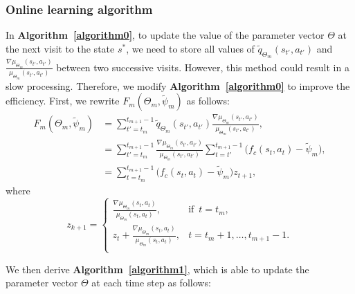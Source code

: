 \documentclass[twocolumn,10pt]{IEEEtran}
\begin{document}
\subsubsection{Online learning algorithm}

In \textbf{Algorithm~\ref{algorithm0}}, to update the value of the parameter vector $\Theta$ at the next visit to the state $s^{*}$, we need to store all values of $\widetilde{q}_{\Theta_{m}}(s_{t'},a_{t'})$ and $\frac{\nabla \mu_{\Theta_{m}}(s_{t'},a_{t'})}{\mu_{\Theta_{m}}(s_{t'},a_{t'})}$ between two successive visits. However, this method could result in a slow processing. Therefore, we modify \textbf{Algorithm~\ref{algorithm0}} to improve the efficiency. First, we rewrite $F_{m}(\Theta_{m},\widetilde{\psi}_{m})$ as follows:
\begin{equation}
\begin{aligned}
F_{m}(\Theta_{m},\widetilde{\psi}_{m}) & = \sum_{t'=t_{m}}^{t_{m+1}-1} \widetilde{q}_{\Theta_{m}}(s_{t'},a_{t'}) \frac{\nabla \mu_{\Theta_{m}}(s_{t'},a_{t'})}{\mu_{\Theta_{m}}(s_{t'},a_{t'})} , \\
&= \sum_{t'=t_{m}}^{t_{m+1}-1}   \frac{\nabla \mu_{\Theta_{m}}(s_{t'},a_{t'})}{\mu_{\Theta_{m}}(s_{t'},a_{t'})}  \sum_{t=t'}^{t_{m+1}-1} \big( f_c (s_{t}, a_{t}) - \widetilde{\psi}_{m}\big) , \\
&= \sum_{t=t_{m}}^{t_{m+1}-1} \big( f_c (s_{t}, a_{t}) - \widetilde{\psi}_{m}\big)  z_{t+1}, 
\end{aligned}
\end{equation}
where
\begin{equation}
z_{k+1} = \left\{ 
\begin{array}{ll}
\frac{\nabla \mu_{\Theta_{m}}(s_{t},a_{t})}{\mu_{\Theta_{m}}(s_{t},a_{t})}, & \text{if} \phantom{1} t = t_{m},\\
z_{t} + \frac{\nabla \mu_{\Theta_{m}}(s_{t},a_{t})}{\mu_{\Theta_{m}}(s_{t},a_{t})}, & t=t_{m}+1,\ldots,t_{m+1}-1. \\
\end{array}
\right.
\label{eq:zupdate_time}
\end{equation}

We then derive \textbf{Algorithm~\ref{algorithm1}}, which is able to update the parameter vector $\Theta$ at each time step as follows:
\end{document}
